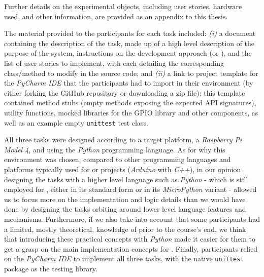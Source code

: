 Further details on the experimental objects, including user stories, hardware used, and other information, are provided as an appendix to this thesis.

The material provided to the participants for each task included: \textit{(i)} a document containing the description of the task, made up of a high level description of the purpose of the system, instructions on the development approach (\ie \tdd or \notdd), and the list of user stories to implement, with each detailing the corresponding class/method to modify in the source code; and \textit{(ii)} a link to project template for the \textit{PyCharm IDE} that the participants had to import in their environment (\ie by either forking the GitHub repository or downloading a zip file); this template contained method stubs (\ie empty methods exposing the expected API signatures), utility functions, mocked libraries for the GPIO library and other components, as well as an example empty \texttt{unittest} test class.

All three tasks were designed according to a target platform, a \textit{Raspberry Pi Model 4}, and using the \textit{Python} programming language. As for why this environment was chosen, compared to other programming languages and platforms typically used for \ess or \iot projects (\eg \textit{Arduino} with \textit{C++}), in our opinion designing the tasks with a higher level language such as \textit{Python} - which is still employed for \ess, either in its standard form or in its \textit{MicroPython} variant - allowed us to focus more on the implementation and logic details than we would have done by designing the tasks orbiting around lower level language features and mechanisms.
Furthermore, if we also take into account that some participants had a limited, mostly theoretical, knowledge of \ess prior to the course's end, we think that introducing these practical concepts with \textit{Python} made it easier for them to get a grasp on the main implementation concepts for \ess. Finally, participants relied on the \textit{PyCharm IDE} to implement all three tasks, with the native \texttt{unittest} package as the testing library.

